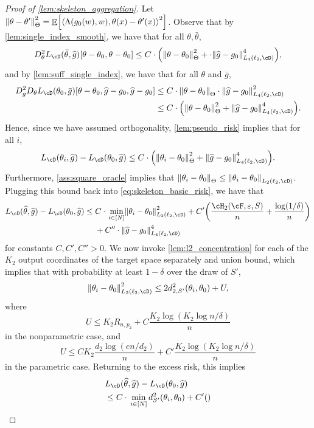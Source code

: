 \documentclass[11pt]{article} %
\newcommand{\pref}[1]{\cref{#1}}
\newcommand{\pfref}[1]{Proof of \pref{#1}}
\theoremstyle{theorem}  %
\theoremstyle{plain}
\DeclarePairedDelimiter{\brk}{[}{]}
\DeclarePairedDelimiter{\prn}{(}{)}
\DeclarePairedDelimiter{\nrm}{\|}{\|}
\DeclarePairedDelimiter{\tri}{\langle}{\rangle}
\DeclareMathOperator{\En}{\mathbb{E}}
\newcommand{\ls}{\ell}
\newcommand{\veps}{\varepsilon}
\newcommand{\wh}[1]{\widehat{#1}}
\newcommand{\poprisk}{L_{\cD}}
\newcommand{\varone}{w} %
\newcommand{\vartwo}{x} %
\newcommand{\estone}{\wh{g}}
\newcommand{\esttwo}{\wh{\theta}}
\newcommand{\ptwo}{p_2}
\newcommand{\dtwo}{d_2}
\newcommand{\target}{\Theta}
\newcommand{\dimtwo}{K_2}
\newcommand{\gtone}{g_0}
\newcommand{\gttwo}{\theta_0}
\begin{document}
\begin{proof}[\pfref{lem:skeleton_aggregation}]
Let $\nrm*{\theta -\theta'}_{\target}^2 =
\En\brk*{\tri*{\Lambda(\gtone(\varone),\varone), \theta(\vartwo) -
    \theta'(\vartwo)}^2}$. Observe that by
\pref{lem:single_index_smooth}, we have that for all $\theta,\bar{\theta}$,
\[
D^{2}_{\theta}\poprisk(\bar{\theta},\estone)[\theta-\gttwo,\theta-\gttwo] \leq C\cdot{}\prn*{\nrm*{\theta-\gttwo}_{\target}^{2}
+ \cdot\nrm*{\estone-\gtone}_{L_4(\ls_2,\cD)}^{4}},
\]
and by \pref{lem:suff_single_index}, we have that for all $\theta$ and $\bar{g}$,
%
\begin{align*}
 D^{2}_{g}D_{\theta}\poprisk(\gttwo,\bar{g})[\theta-\gttwo,\estone-\gtone,\estone-\gtone] &\leq{} 
 C\cdot\nrm*{\theta-\gttwo}_{\target}\cdot\nrm*{\estone-\gtone}_{L_4(\ls_2,\cD)}^{2}\\
&\leq{} 
 C\cdot\prn*{\nrm*{\theta-\gttwo}_{\target}^{2} + \nrm*{\estone-\gtone}_{L_4(\ls_2,\cD)}^{4}}. 
\end{align*}
Hence, since we have assumed orthogonality, \pref{lem:pseudo_risk}
implies that for all $i$,
\[
  \poprisk(\theta_i,\estone) - \poprisk(\gttwo,\estone)
  \leq{} C\cdot{}
    \prn*{\nrm*{\theta_i-\gttwo}_{\target}^{2} + \nrm*{\estone-\gtone}_{L_4(\ls_2,\cD)}^{4}}.
\]
Furthermore, \pref{ass:square_oracle} implies that
$\nrm*{\theta_i-\gttwo}_{\target}\leq{}\nrm*{\theta_i-\gttwo}_{L_2(\ls_2,\cD)}$. Plugging
this bound back into \pref{eq:skeleton_basic_risk}, we have that
\begin{align*}
\poprisk(\esttwo,\estone) - \poprisk(\gttwo,\estone) &\leq{}C\cdot{}\min_{i\in\brk*{N}}\nrm*{\theta_i-\gttwo}_{L_2(\ls_2,\cD)}^{2} + C'\prn*{
\frac{\cH_2(\cF,\veps,S)}{n} + \frac{\log(1/\delta)}{n}
} \\&~~~~+ C''\cdot\nrm*{\estone-\gtone}_{L_4(\ls_2,\cD)}^{4}
\end{align*}
for constants $C,C',C''>0$. We now invoke \pref{lem:l2_concentration} for each of the $\dimtwo$ output coordinates of the target space separately and union bound, which implies that with probability at least $1-\delta$ over the draw of $S'$,
\[
\nrm*{\theta_i-\gttwo}_{L_2(\ls_2,\cD)}^{2}
\leq{} 2d_{2,S'}^{2}(\theta_i,\gttwo) + U,
\]
where \[U\leq{} \dimtwo{}R_{n,\ptwo} + C\frac{\dimtwo\log(\dimtwo\log{}n/\delta)}{n}\]
in the nonparametric case, and \[U\leq{}C\dimtwo{}\frac{\dtwo\log(en/\dtwo)}{n} + C'\frac{\dimtwo\log(\dimtwo\log{}n/\delta)}{n}\] in the parametric case.
Returning to the excess risk, this implies
\begin{align*}
&\poprisk(\esttwo,\estone) - \poprisk(\gttwo,\estone) \\&\leq{}C\cdot{}\min_{i\in\brk*{N}}d_{S'}^{2}(\theta_i,\gttwo) + C'\prn*{
}
\end{align*}
\end{proof}
\end{document}
